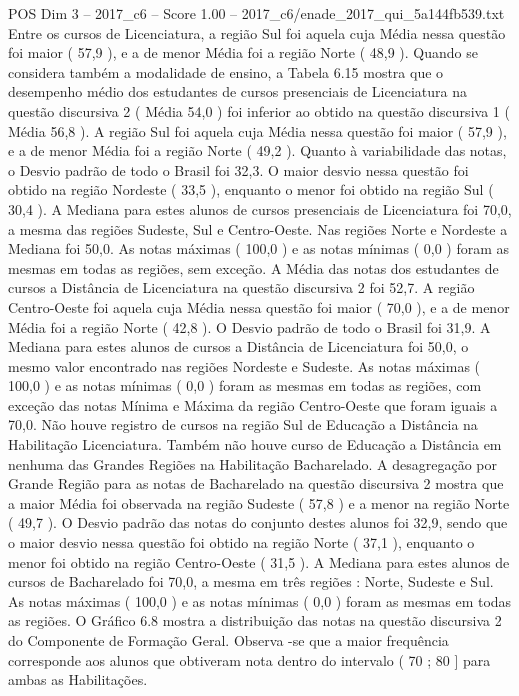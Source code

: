 \begin{textsample}{POS Dim 3 – 2017\_c6 – Score 1.00 – 2017\_c6/enade\_2017\_qui\_5a144fb539.txt}
Entre os cursos de Licenciatura, a região Sul foi aquela cuja Média nessa questão foi maior ( 57,9 ), e a de menor Média foi a região Norte ( 48,9 ).
Quando se considera também a modalidade de ensino, a Tabela 6.15 mostra que o desempenho médio dos estudantes de cursos presenciais de Licenciatura na questão discursiva 2 ( Média 54,0 ) foi inferior ao obtido na questão discursiva 1 ( Média 56,8 ).
A região Sul foi aquela cuja Média nessa questão foi maior ( 57,9 ), e a de menor Média foi a região Norte ( 49,2 ).
Quanto à variabilidade das notas, o Desvio padrão de todo o Brasil foi 32,3.
O maior desvio nessa questão foi obtido na região Nordeste ( 33,5 ), enquanto o menor foi obtido na região Sul ( 30,4 ).
A Mediana para estes alunos de cursos presenciais de Licenciatura foi 70,0, a mesma das regiões Sudeste, Sul e Centro-Oeste.
Nas regiões Norte e Nordeste a Mediana foi 50,0.
As notas máximas ( 100,0 ) e as notas mínimas ( 0,0 ) foram as mesmas em todas as regiões, sem exceção.
A Média das notas dos estudantes de cursos a Distância de Licenciatura na questão discursiva 2 foi 52,7.
A região Centro-Oeste foi aquela cuja Média nessa questão foi maior ( 70,0 ), e a de menor Média foi a região Norte ( 42,8 ).
O Desvio padrão de todo o Brasil foi 31,9.
A Mediana para estes alunos de cursos a Distância de Licenciatura foi 50,0, o mesmo valor encontrado nas regiões Nordeste e Sudeste.
As notas máximas ( 100,0 ) e as notas mínimas ( 0,0 ) foram as mesmas em todas as regiões, com exceção das notas Mínima e Máxima da região Centro-Oeste que foram iguais a 70,0.
Não houve registro de cursos na região Sul de Educação a Distância na Habilitação Licenciatura.
Também não houve curso de Educação a Distância em nenhuma das Grandes Regiões na Habilitação Bacharelado.
A desagregação por Grande Região para as notas de Bacharelado na questão discursiva 2 mostra que a maior Média foi observada na região Sudeste ( 57,8 ) e a menor na região Norte ( 49,7 ).
O Desvio padrão das notas do conjunto destes alunos foi 32,9, sendo que o maior desvio nessa questão foi obtido na região Norte ( 37,1 ), enquanto o menor foi obtido na região Centro-Oeste ( 31,5 ).
A Mediana para estes alunos de cursos de Bacharelado foi 70,0, a mesma em três regiões : Norte, Sudeste e Sul.
As notas máximas ( 100,0 ) e as notas mínimas ( 0,0 ) foram as mesmas em todas as regiões.
O Gráfico 6.8 mostra a distribuição das notas na questão discursiva 2 do Componente de Formação Geral.
Observa -se que a maior frequência corresponde aos alunos que obtiveram nota dentro do intervalo ( 70 ; 80 ] para ambas as Habilitações.

\end{textsample}
